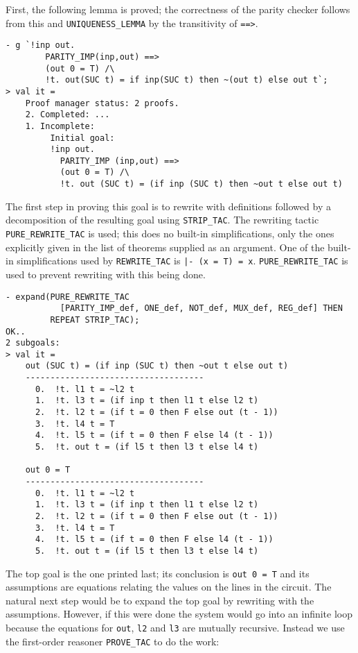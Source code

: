First, the following lemma is proved; the correctness of the parity
checker follows from this and {\small\verb|UNIQUENESS_LEMMA|} by the
transitivity of {\small{\tt\verb+==>+}}.

\begin{session}
\begin{verbatim}
- g `!inp out.
        PARITY_IMP(inp,out) ==>
        (out 0 = T) /\
        !t. out(SUC t) = if inp(SUC t) then ~(out t) else out t`;
> val it =
    Proof manager status: 2 proofs.
    2. Completed: ...
    1. Incomplete:
         Initial goal:
         !inp out.
           PARITY_IMP (inp,out) ==>
           (out 0 = T) /\
           !t. out (SUC t) = (if inp (SUC t) then ~out t else out t)
\end{verbatim}
\end{session}

The first step in proving this goal is to rewrite with definitions
followed by a decomposition of the resulting goal using
{\small\verb|STRIP_TAC|}. The rewriting tactic
{\small\verb|PURE_REWRITE_TAC|} is used; this does no built-in
simplifications, only the ones explicitly given in the list of
theorems supplied as an argument.  One of the built-in simplifications
used by {\small\verb|REWRITE_TAC|} is {\small\tt |-~(x~=~T)~=~x}.
{\small\verb|PURE_REWRITE_TAC|} is used to prevent rewriting with this
being done.
\begin{session}
\begin{verbatim}
- expand(PURE_REWRITE_TAC
           [PARITY_IMP_def, ONE_def, NOT_def, MUX_def, REG_def] THEN
         REPEAT STRIP_TAC);
OK..
2 subgoals:
> val it =
    out (SUC t) = (if inp (SUC t) then ~out t else out t)
    ------------------------------------
      0.  !t. l1 t = ~l2 t
      1.  !t. l3 t = (if inp t then l1 t else l2 t)
      2.  !t. l2 t = (if t = 0 then F else out (t - 1))
      3.  !t. l4 t = T
      4.  !t. l5 t = (if t = 0 then F else l4 (t - 1))
      5.  !t. out t = (if l5 t then l3 t else l4 t)

    out 0 = T
    ------------------------------------
      0.  !t. l1 t = ~l2 t
      1.  !t. l3 t = (if inp t then l1 t else l2 t)
      2.  !t. l2 t = (if t = 0 then F else out (t - 1))
      3.  !t. l4 t = T
      4.  !t. l5 t = (if t = 0 then F else l4 (t - 1))
      5.  !t. out t = (if l5 t then l3 t else l4 t)
\end{verbatim}
\end{session}

The top goal is the one printed last; its conclusion is
{\small\verb|out 0 = T|} and its assumptions are equations relating
the values on the lines in the circuit.  The natural next step would
be to expand the top goal by rewriting with the assumptions.  However,
if this were done the system would go into an infinite loop because
the equations for {\small\verb|out|}, {\small\verb|l2|} and
{\small\verb|l3|} are mutually recursive.  Instead we use the
first-order reasoner {\small\verb|PROVE_TAC|} to do the work:


